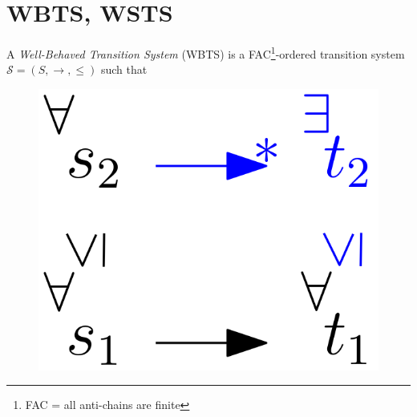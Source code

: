 \documentclass{beamer}
\begin{document}
	\section{WBTS, WSTS}
  \begin{frame}{}
  
  \begin{definition}
A {\em Well-Behaved Transition System} (WBTS) 
is a FAC\footnote{FAC = all anti-chains are finite}-ordered transition system $\mathscr{S}=(S, \rightarrow, \leq)$ such that   
\end{definition}


   \begin{center}
 	\begin{figure}
\includegraphics[width=.25\textwidth]{WSTS_def}
	\end{figure}
\end{center}  



    \end{frame}
\end{document}
